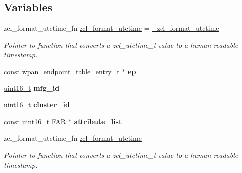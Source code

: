 \subsection*{Variables}
\begin{DoxyCompactItemize}
\item 
zcl\-\_\-format\-\_\-utctime\-\_\-fn \hyperlink{group__zcl__client_gaece15f78359a3bae016be1d24e7d9ad9}{zcl\-\_\-format\-\_\-utctime} = \hyperlink{group__zcl__client_gab6b575402b7ce107943e7d7c29499559}{\-\_\-zcl\-\_\-format\-\_\-utctime}
\begin{DoxyCompactList}\small\item\em Pointer to function that converts a zcl\-\_\-utctime\-\_\-t value to a human-\/readable timestamp. \end{DoxyCompactList}\item 
\hypertarget{group__zcl__client_ga459df22e40148e87ee6e57ec5cc3233a}{const \hyperlink{structwpan__endpoint__table__entry__t}{wpan\-\_\-endpoint\-\_\-table\-\_\-entry\-\_\-t} $\ast$ {\bfseries ep}}\label{group__zcl__client_ga459df22e40148e87ee6e57ec5cc3233a}

\item 
\hypertarget{group__zcl__client_ga2ca485436d30af714cc277eaac216cae}{\hyperlink{group__hal_ga5a8b2dc9e45a9ee81a94ef304fb62505}{uint16\-\_\-t} {\bfseries mfg\-\_\-id}}\label{group__zcl__client_ga2ca485436d30af714cc277eaac216cae}

\item 
\hypertarget{group__zcl__client_ga262a92f94287e77cb56350951893bae2}{\hyperlink{group__hal_ga5a8b2dc9e45a9ee81a94ef304fb62505}{uint16\-\_\-t} {\bfseries cluster\-\_\-id}}\label{group__zcl__client_ga262a92f94287e77cb56350951893bae2}

\item 
\hypertarget{group__zcl__client_ga4dc4f61b6b33cb99330d56098bb9bf2a}{const \hyperlink{group__hal_ga5a8b2dc9e45a9ee81a94ef304fb62505}{uint16\-\_\-t} \hyperlink{group__hal_gaef060b3456fdcc093a7210a762d5f2ed}{F\-A\-R} $\ast$ {\bfseries attribute\-\_\-list}}\label{group__zcl__client_ga4dc4f61b6b33cb99330d56098bb9bf2a}

\item 
zcl\-\_\-format\-\_\-utctime\-\_\-fn \hyperlink{group__zcl__client_gaece15f78359a3bae016be1d24e7d9ad9}{zcl\-\_\-format\-\_\-utctime}
\begin{DoxyCompactList}\small\item\em Pointer to function that converts a zcl\-\_\-utctime\-\_\-t value to a human-\/readable timestamp. \end{DoxyCompactList}\end{DoxyCompactItemize}


